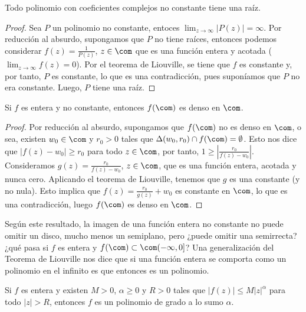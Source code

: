 \begin{teo}
Todo polinomio con coeficientes complejos no constante tiene una raíz.
\end{teo}

\begin{proof}
Sea $P$ un polinomio no constante, entoces $\lim_{z \to \infty}{|P(z)| = \infty}$. Por reducción al absurdo, supongamos que $P$ no tiene raíces, entonces podemos considerar $f(z) = \frac{1}{P(z)}$, $z \in \com$ que es una función entera y acotada ($\lim_{z \to \infty}{f(z)} = 0$). Por el teorema de Liouville, se tiene que $f$ es constante y, por tanto, $P$ es constante, lo que es una contradicción, pues suponíamos que $P$ no era constante. Luego, $P$ tiene una raíz.
\end{proof}

\begin{teo}[de Liouville]
Si $f$ es entera y no constante, entonces $f(\com)$ es denso en $\com$.
\end{teo}

\begin{proof}
Por reducción al absurdo, supongamos que $f(\com)$ no es denso en $\com$, o sea, existen $w_0 \in \com$ y $r_0 > 0$ tales que $\Delta(w_0,r_0) \cap f(\com) = \emptyset$. Esto nos dice que $|f(z) - w_0| \ge r_0$ para todo $z \in \com$, por tanto, $1 \ge \left| \frac{r_0}{f(z) - w_0} \right|$. Consideramos $g(z) = \frac{r_0}{f(z) - w_0}$, $z \in \com$, que es una función entera, acotada y nunca cero. Aplicando el teorema de Liouville, tenemos que $g$ es una constante (y no nula). Esto implica que $f(z) = \frac{r_0}{g(z)} + w_0$ es constante en $\com$, lo que es una contradicción, luego $f(\com)$ es denso en $\com$.
\end{proof}

\begin{obs}
Según este resultado, la imagen de una función entera no constante no puede omitir un disco, mucho menos un semiplano, pero ¿puede omitir una semirrecta? ¿qué pasa si $f$ es entera y $f(\com) \subset \com (-\infty,0]$? Una generalización del Teorema de Liouville nos dice que si una función entera se comporta como un polinomio en el infinito es que entonces es un polinomio.
\end{obs}

\begin{teo}[de Liouville]
Si $f$ es entera y existen $M > 0$, $\alpha \ge 0$ y $R > 0$ tales que $|f(z)| \leq M|z|^{\alpha}$ para todo $|z| > R$, entonces $f$ es un polinomio de grado a lo sumo $\alpha$.
\end{teo}

